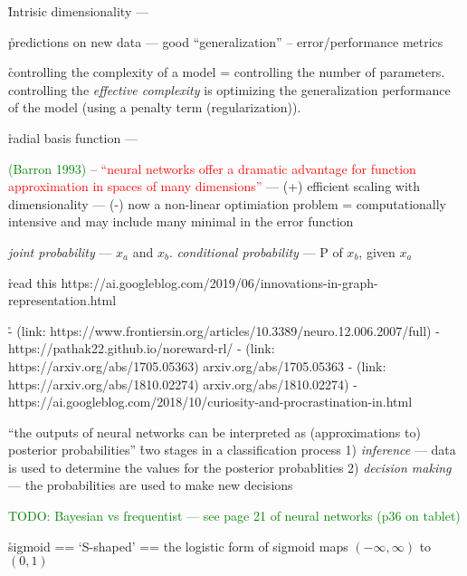 \r{Intrisic dimensionality --- }


\r{predictions on new data --- good ``generalization'' -- error/performance metrics}

\r{controlling the complexity of a model = controlling the number of parameters. controlling the \textit{effective complexity} is optimizing the generalization performance of the model (using a penalty term (regularization)).}


\r{radial basis function --- }


\r{\textcolor{green}{(Barron 1993)} -- \textcolor{red}{``neural networks offer a dramatic advantage for function approximation in spaces of many dimensions''} --- (+) efficient scaling with dimensionality --- (-) now a non-linear optimiation problem = computationally intensive and may include many minimal in the error function}


\r{\textit{joint probability} --- $x_a$ and $x_b$. \textit{conditional probability} --- P of $x_b$, given $x_a$}






\r{read this https://ai.googleblog.com/2019/06/innovations-in-graph-representation.html}

\r{- (link: https://www.frontiersin.org/articles/10.3389/neuro.12.006.2007/full)
	- https://pathak22.github.io/noreward-rl/
	- (link: https://arxiv.org/abs/1705.05363) arxiv.org/abs/1705.05363
	- (link: https://arxiv.org/abs/1810.02274) arxiv.org/abs/1810.02274)
	- https://ai.googleblog.com/2018/10/curiosity-and-procrastination-in.html}



\r{``the outputs of neural networks can be interpreted as (approximations to) posterior probabilities''} \r{two stages in a classification process 1) \textit{inference} --- data is used to determine the values for the posterior probablities 2) \textit{decision making} --- the probabilities are used to make new decisions}


\textcolor{green}{TODO: Bayesian vs frequentist --- see page 21 of neural networks (p36 on tablet)}

\r{sigmoid == `S-shaped' == the logistic form of sigmoid maps $(-\infty, \infty)$ to $(0, 1)$}


